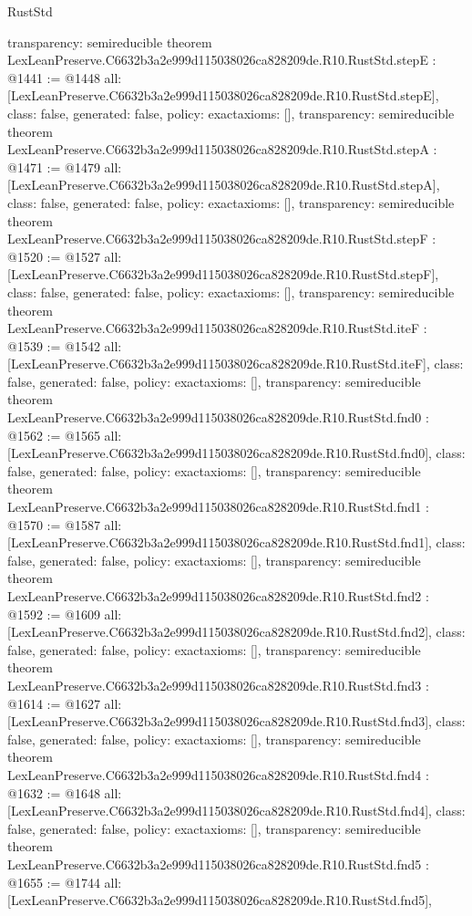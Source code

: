 \begin{lexlean}{RustStd}
\begin{coremodule}
{  transparency: semireducible
}
theorem LexLeanPreserve.C6632b3a2e999d115038026ca828209de.R10.RustStd.stepE : @1441 := @1448 {
  all: [LexLeanPreserve.C6632b3a2e999d115038026ca828209de.R10.RustStd.stepE],
  class: false,
  generated: false,
  policy: exact{axioms: []},
  transparency: semireducible
}
theorem LexLeanPreserve.C6632b3a2e999d115038026ca828209de.R10.RustStd.stepA : @1471 := @1479 {
  all: [LexLeanPreserve.C6632b3a2e999d115038026ca828209de.R10.RustStd.stepA],
  class: false,
  generated: false,
  policy: exact{axioms: []},
  transparency: semireducible
}
theorem LexLeanPreserve.C6632b3a2e999d115038026ca828209de.R10.RustStd.stepF : @1520 := @1527 {
  all: [LexLeanPreserve.C6632b3a2e999d115038026ca828209de.R10.RustStd.stepF],
  class: false,
  generated: false,
  policy: exact{axioms: []},
  transparency: semireducible
}
theorem LexLeanPreserve.C6632b3a2e999d115038026ca828209de.R10.RustStd.iteF : @1539 := @1542 {
  all: [LexLeanPreserve.C6632b3a2e999d115038026ca828209de.R10.RustStd.iteF],
  class: false,
  generated: false,
  policy: exact{axioms: []},
  transparency: semireducible
}
theorem LexLeanPreserve.C6632b3a2e999d115038026ca828209de.R10.RustStd.fnd0 : @1562 := @1565 {
  all: [LexLeanPreserve.C6632b3a2e999d115038026ca828209de.R10.RustStd.fnd0],
  class: false,
  generated: false,
  policy: exact{axioms: []},
  transparency: semireducible
}
theorem LexLeanPreserve.C6632b3a2e999d115038026ca828209de.R10.RustStd.fnd1 : @1570 := @1587 {
  all: [LexLeanPreserve.C6632b3a2e999d115038026ca828209de.R10.RustStd.fnd1],
  class: false,
  generated: false,
  policy: exact{axioms: []},
  transparency: semireducible
}
theorem LexLeanPreserve.C6632b3a2e999d115038026ca828209de.R10.RustStd.fnd2 : @1592 := @1609 {
  all: [LexLeanPreserve.C6632b3a2e999d115038026ca828209de.R10.RustStd.fnd2],
  class: false,
  generated: false,
  policy: exact{axioms: []},
  transparency: semireducible
}
theorem LexLeanPreserve.C6632b3a2e999d115038026ca828209de.R10.RustStd.fnd3 : @1614 := @1627 {
  all: [LexLeanPreserve.C6632b3a2e999d115038026ca828209de.R10.RustStd.fnd3],
  class: false,
  generated: false,
  policy: exact{axioms: []},
  transparency: semireducible
}
theorem LexLeanPreserve.C6632b3a2e999d115038026ca828209de.R10.RustStd.fnd4 : @1632 := @1648 {
  all: [LexLeanPreserve.C6632b3a2e999d115038026ca828209de.R10.RustStd.fnd4],
  class: false,
  generated: false,
  policy: exact{axioms: []},
  transparency: semireducible
}
theorem LexLeanPreserve.C6632b3a2e999d115038026ca828209de.R10.RustStd.fnd5 : @1655 := @1744 {
  all: [LexLeanPreserve.C6632b3a2e999d115038026ca828209de.R10.RustStd.fnd5],
}
\end{coremodule}
\end{lexlean}
